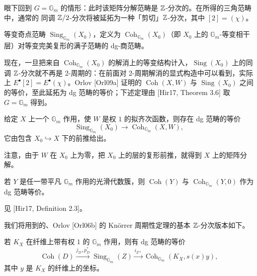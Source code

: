 眼下回到 $G=\mathbb G_m$ 的情形：此时该矩阵分解范畴是 $\Z$-分次的。在所得的三角范畴中，通常的
同调 $\mathbb{Z}/2$-分次将被延拓为一种「剪切」$\Z$-分次，其中 $[2]=(\chi)$。


\begin{definition}\label{def:equiv-sing}
等变奇点范畴 $\operatorname{Sing}_{\mathbb G_m}(X_0)$，定义为 $\operatorname{Coh}_{\mathbb G_m}(X_0)$（即 $X_0$ 上的
$\mathbb G_m$-等变相干层）对等变完美复形的满子范畴的 dg-商范畴。
\end{definition}

现在，一旦把来自 $\operatorname{Coh}_{\mathbb G_m}(X_0)$ 的解消上的等变结构计入，$\operatorname{Sing}(X_0)$
上的同调 $\Z$-分次就不再是 2-周期的：在前面对 2-周期解消的显式构造中可以看到，实际上
$E^\bullet[2]=E^\bullet(\chi)$。Orlov [Orl09a] 证明的 $\operatorname{Coh}(X,W)$ 与
$\operatorname{Sing}(X_0)$ 之间的等价，至此延拓为 dg 范畴的等价；下述定理由
[Hir17, Theorem 3.6] 取 $G=\mathbb G_m$ 得到。

\begin{theorem}[{$\Z$-分次 Orlov 定理}]\label{thm:zgraded-orlov}
给定 $X$ 上一个 $\mathbb G_m$ 作用，使 $W$ 是权 $1$ 的拟齐次函数，则存在 dg 范畴的等价
\[
\operatorname{Sing}_{\mathbb G_m}(X_0)\to\operatorname{Coh}_{\mathbb G_m}(X,W),
\]
它由包含 $X_0\hookrightarrow X$ 下的前推给出。
\end{theorem}

注意，由于 $W$ 在 $X_0$ 上为零，把 $X_0$ 上的层的复形前推，就得到 $X$ 上的矩阵分解。

\begin{lemma}\label{lem:6-1-6}
若 $Y$ 是任一带平凡 $\mathbb G_m$ 作用的光滑代数簇，则 $\operatorname{Coh}(Y)$ 与 $\operatorname{Coh}_{\mathbb G_m}(Y,0)$ 作为 dg
范畴等价。
\end{lemma}

见 [Hir17, Definition 2.3]。


我们将用到的、Orlov [Orl06b] 的 Knörrer 周期性定理的基本 $\Z$-分次版本如下。

\begin{lemma}\label{lem:6-1-7}
若 $K_X$ 在纤维上带有权 $1$ 的 $\mathbb G_m$ 作用，则有 dg 范畴的等价
\[
\operatorname{Coh}(D)\xrightarrow{j_{D*}p_D^*}\operatorname{Sing}_{\mathbb G_m}(Z)
\xrightarrow{i_{Z*}}\operatorname{Coh}_{\mathbb G_m}(K_X,s(x)y),
\]
其中 $y$ 是 $K_X$ 的纤维上的坐标。
\end{lemma}

